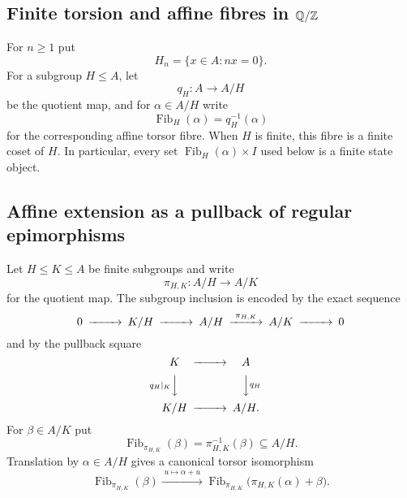 \subsection{Finite torsion and affine fibres in \texorpdfstring{$\mathbb Q/\mathbb Z$}{Q/Z}}

For $n\ge1$ put
\[
H_n=\{x\in A:nx=0\}.
\]
For a subgroup $H\le A$, let
\[
q_H:A\longrightarrow A/H
\]
be the quotient map, and for $\alpha\in A/H$ write
\[
\operatorname{Fib}_H(\alpha)=q_H^{-1}(\alpha)
\]
for the corresponding affine torsor fibre.  When $H$ is finite, this fibre is a finite coset of $H$.  In particular, every set $\operatorname{Fib}_H(\alpha)\times I$ used below is a finite state object.

\subsection{Affine extension as a pullback of regular epimorphisms}

Let $H\le K\le A$ be finite subgroups and write
\[
\pi_{H,K}:A/H\longrightarrow A/K
\]
for the quotient map.  The subgroup inclusion is encoded by the exact sequence
\begin{equation}\label{eq:affine-extension-exact}
\begin{CD}
0 @>>> K/H @>>> A/H @>{\pi_{H,K}}>> A/K @>>> 0
\end{CD}
\end{equation}
and by the pullback square
\begin{equation}\label{eq:affine-extension-pullback}
\begin{CD}
K @>>> A\\
@V{q_H|_K}VV @VV{q_H}V\\
K/H @>>> A/H.
\end{CD}
\end{equation}
For $\beta\in A/K$ put
\[
\operatorname{Fib}_{\pi_{H,K}}(\beta)
=\pi_{H,K}^{-1}(\beta)\subseteq A/H.
\]
Translation by $\alpha\in A/H$ gives a canonical torsor isomorphism
\begin{equation}\label{eq:fibre-translation-isomorphism}
\operatorname{Fib}_{\pi_{H,K}}(\beta)
\xrightarrow{\;u\mapsto\alpha+u\;}
\operatorname{Fib}_{\pi_{H,K}}\!\bigl(\pi_{H,K}(\alpha)+\beta\bigr).
\end{equation}


